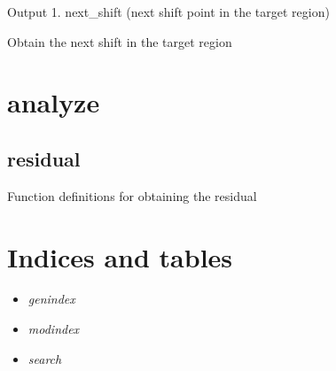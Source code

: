 \documentclass[letterpaper,10pt,english]{sphinxmanual}
\begin{document}
Output
1. next\_shift (next shift point in the target region)

\begin{fulllineitems}
\label{index:cover.next_shift}
Obtain the next shift in the target region

\end{fulllineitems}



\chapter{analyze}
\label{index:analyze}

\section{residual}
\label{index:residual}\label{index:module-residual}
Function definitions for obtaining the residual


\chapter{Indices and tables}
\label{index:indices-and-tables}\begin{itemize}
\item {} 
\emph{genindex}

\item {} 
\emph{modindex}

\item {} 
\emph{search}

\end{itemize}
\end{document}
